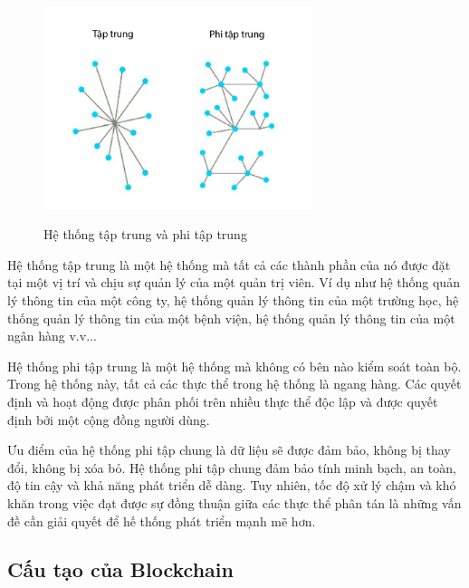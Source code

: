 \begin{figure}[h]
    \centering
    \includegraphics[width=0.7\textwidth]{images/He_thong_tap_chung:phi_tap_chung.png}
    \label{fig:He_thong_tap_chung/phi_tap_chung}
    \caption{Hệ thống tập trung và phi tập trung}
\end{figure}

Hệ thống tập trung là một hệ thống mà tất cả các thành phần của nó
được đặt tại một vị trí và chịu sự quản lý của một quản trị viên.
Ví dụ như hệ thống quản lý thông tin của một công ty, hệ thống
quản lý thông tin của một trường học, hệ thống quản lý thông tin
của một bệnh viện, hệ thống quản lý thông tin của một ngân hàng
v.v...

Hệ thống phi tập trung là một hệ thống mà không có bên nào kiểm soát 
toàn bộ. Trong hệ thống này, tất cả các thực thể trong hệ thống là 
ngang hàng. Các quyết định và hoạt động được phân phối trên nhiều 
thực thể độc lập và được quyết định bởi một cộng đồng người dùng.

Ưu điểm của hệ thống phi tập chung là dữ liệu sẽ được đảm bảo, 
không bị thay đổi, không bị xóa bỏ. Hệ thống phi tập chung đảm bảo
tính minh bạch, an toàn, độ tin cậy và khả năng phát triển dễ dàng.
Tuy nhiên, tốc độ xử lý chậm và khó khăn trong việc đạt được sự đồng
thuận giữa các thực thể phân tán là những vấn đề cần giải quyết để 
hế thống phát triển mạnh mẽ hơn.

\subsection{Cấu tạo của Blockchain}

